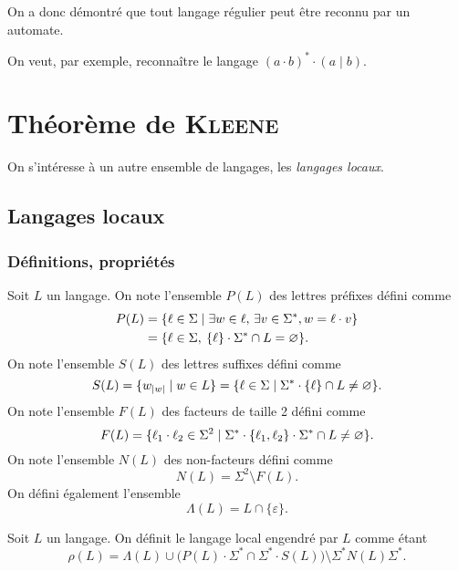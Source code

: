 On a donc démontré que tout langage régulier peut être reconnu par un automate.

\begin{exm}
	On veut, par exemple, reconnaître le langage $(a\cdot b)^* \cdot (a \mid b)$.
\end{exm}

\section{Théorème de {\scshape Kleene}}
On s'intéresse à un autre ensemble de langages, les {\it langages locaux}.
\subsection{Langages locaux}
\subsubsection{Définitions, propriétés}

\begin{defn}
	Soit $L$\/ un langage. On note l'ensemble $P(L)$\/ des lettres préfixes défini comme
	\begin{align*}
		P(L) &= \{\ell \in \Sigma  \mid  \exists w \in \ell,\,\exists v \in \Sigma^* , w = \ell\cdot v\}\\
		&= \{\ell \in \Sigma,\: \{\ell\} \cdot \Sigma^* \cap L = \varnothing\}. \\
	\end{align*}
	On note l'ensemble $S(L)$\/ des lettres suffixes défini comme \[
		S(L) = \{w_{|w|} \mid w \in L\} = \{\ell \in \Sigma  \mid  \Sigma^* \cdot \{\ell\}\cap L \neq \varnothing\}
	.\]
	On note l'ensemble $F(L)$\/ des facteurs de taille 2 défini comme \[
		F(L) = \{\ell_1\cdot \ell_2 \in \Sigma^2 \mid \Sigma^* \cdot \{\ell_1,\ell_2\} \cdot \Sigma^* \cap L \neq \varnothing\}
	.\]
	On note l'ensemble $N(L)$\/ des non-facteurs défini comme \[
		N(L) = \Sigma^2 \setminus F(L)
	.\]
	On défini également l'ensemble \[
		\Lambda(L) = L \cap \{\varepsilon\}
	.\]
\end{defn}

\begin{defn}
	Soit $L$\/ un langage. On définit le langage local engendré par $L$\/ comme étant \[
		\rho(L) =\Lambda(L) \cup \Big(P(L) \cdot \Sigma^* \cap \Sigma^* \cdot S(L)\Big)\setminus \Sigma^* N(L) \Sigma^*
	.\]
\end{defn}

